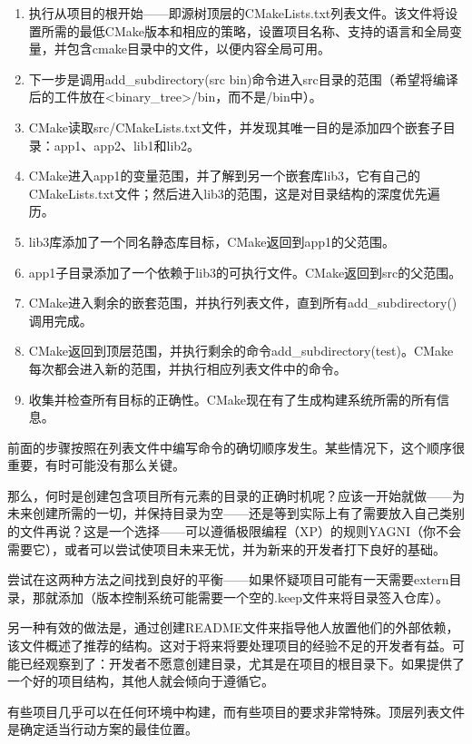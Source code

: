\begin{enumerate}
\item
执行从项目的根开始——即源树顶层的CMakeLists.txt列表文件。该文件将设置所需的最低CMake版本和相应的策略，设置项目名称、支持的语言和全局变量，并包含cmake目录中的文件，以便内容全局可用。

\item
下一步是调用add\_subdirectory(src bin)命令进入src目录的范围（希望将编译后的工件放在<binary\_tree>/bin，而不是/bin中）。

\item
CMake读取src/CMakeLists.txt文件，并发现其唯一目的是添加四个嵌套子目录：app1、app2、lib1和lib2。

\item
CMake进入app1的变量范围，并了解到另一个嵌套库lib3，它有自己的CMakeLists.txt文件；然后进入lib3的范围，这是对目录结构的深度优先遍历。

\item
lib3库添加了一个同名静态库目标，CMake返回到app1的父范围。

\item
app1子目录添加了一个依赖于lib3的可执行文件。CMake返回到src的父范围。

\item
CMake进入剩余的嵌套范围，并执行列表文件，直到所有add\_subdirectory()调用完成。

\item
CMake返回到顶层范围，并执行剩余的命令add\_subdirectory(test)。CMake每次都会进入新的范围，并执行相应列表文件中的命令。

\item
收集并检查所有目标的正确性。CMake现在有了生成构建系统所需的所有信息。
\end{enumerate}

前面的步骤按照在列表文件中编写命令的确切顺序发生。某些情况下，这个顺序很重要，有时可能没有那么关键。

那么，何时是创建包含项目所有元素的目录的正确时机呢？应该一开始就做——为未来创建所需的一切，并保持目录为空——还是等到实际上有了需要放入自己类别的文件再说？这是一个选择——可以遵循极限编程（XP）的规则YAGNI（你不会需要它），或者可以尝试使项目未来无忧，并为新来的开发者打下良好的基础。

尝试在这两种方法之间找到良好的平衡——如果怀疑项目可能有一天需要extern目录，那就添加（版本控制系统可能需要一个空的.keep文件来将目录签入仓库）。

另一种有效的做法是，通过创建README文件来指导他人放置他们的外部依赖，该文件概述了推荐的结构。这对于将来将要处理项目的经验不足的开发者有益。可能已经观察到了：开发者不愿意创建目录，尤其是在项目的根目录下。如果提供了一个好的项目结构，其他人就会倾向于遵循它。

有些项目几乎可以在任何环境中构建，而有些项目的要求非常特殊。顶层列表文件是确定适当行动方案的最佳位置。




